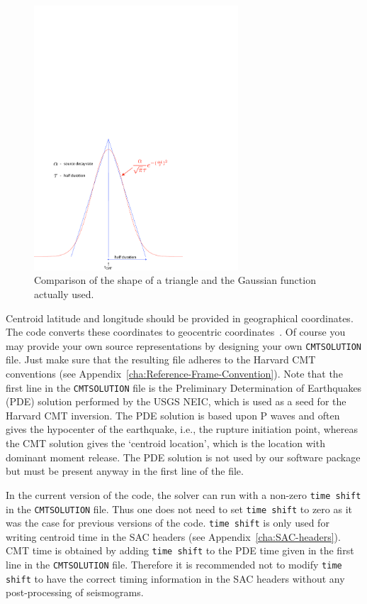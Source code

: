 \documentclass[oneside,english]{book}
\begin{document}
%
\begin{figure}
\noindent \begin{centering}
\includegraphics[width=3in]{figures/gauss_vs_triangle_mod}
\par\end{centering}

\caption{Comparison of the shape of a triangle and the Gaussian function actually
used.}


\label{fig:gauss.vs.triangle}
\end{figure}


Centroid latitude and longitude should be provided in geographical
coordinates. The code converts these coordinates to geocentric coordinates~\citep{DaTr98}.
Of course you may provide your own source representations by designing
your own \texttt{CMTSOLUTION} file. Just make sure that the resulting
file adheres to the Harvard CMT conventions (see Appendix~\ref{cha:Reference-Frame-Convention}).
Note that the first line in the \texttt{CMTSOLUTION} file is the Preliminary Determination of Earthquakes (PDE) solution performed by the USGS NEIC, which is used as a seed for the Harvard CMT inversion. The PDE solution is based upon P waves and often gives the hypocenter of the earthquake, i.e., the rupture initiation point, whereas the CMT solution gives the `centroid location', which is the location with dominant moment release. The PDE solution is not used by our software package but must be present anyway in the first line of the file.

In the current version of the code, the solver can run with a non-zero \texttt{time shift} in the \texttt{CMTSOLUTION} file. Thus one does not need to set \texttt{time shift} to zero as it was the case for previous versions of the code. \texttt{time shift} is only used for writing centroid time in the SAC headers (see Appendix~\ref{cha:SAC-headers}). CMT time is obtained by adding \texttt{time shift} to the PDE time given in the first line in the \texttt{CMTSOLUTION} file. Therefore it is recommended not to modify \texttt{time shift} to have the correct timing information in the SAC headers without any post-processing of seismograms.
\end{document}
